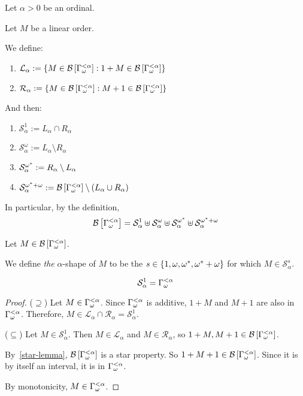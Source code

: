 \begin{definitions}
  Let $\alpha > 0$ be an ordinal.

  Let $M$ be a linear order.

  We define:
  \begin{enumerate}
    \item $\mathcal{L}_{\alpha} := \left\{ {M \in \mathcal{B} \left[ {{\Gamma_{\omega}^{< \alpha}}} \right] : 1 + M \in \mathcal{B} \left[ {{\Gamma_{\omega}^{< \alpha}}} \right]} \right\}$
    \item $\mathcal{R}_{\alpha} := \left\{ {M \in \mathcal{B} \left[ {{\Gamma_{\omega}^{< \alpha}}} \right] : M + 1 \in \mathcal{B} \left[ {{\Gamma_{\omega}^{< \alpha}}} \right]} \right\}$
  \end{enumerate}

  And then:
  \begin{enumerate}
    \item $\mathcal{S}^{1}_{\alpha} := L_{\alpha} \cap R_{\alpha}$
    \item $\mathcal{S}^{\omega}_{\alpha} := L_{\alpha} \setminus R_{\alpha}$
    \item $\mathcal{S}^{\omega^\ast}_{\alpha} := R_{\alpha} \setminus L_{\alpha}$
    \item $\mathcal{S}^{\omega^\ast + \omega}_{\alpha} := \mathcal{B} \left[ {{\Gamma_{\omega}^{< \alpha}}} \right] \setminus (L_{\alpha} \cup R_{\alpha})$
  \end{enumerate}

  In particular, by the definition,
  \[
    \mathcal{B} \left[ {{\Gamma_{\omega}^{< \alpha}}} \right]
    = \mathcal{S}^{1}_{\alpha}
    \uplus \mathcal{S}^{\omega}_{\alpha}
    \uplus \mathcal{S}^{\omega^\ast}_{\alpha}
    \uplus \mathcal{S}^{\omega^\ast + \omega}_{\alpha}
  \]

  Let $M \in \mathcal{B} \left[ {{\Gamma_{\omega}^{< \alpha}}} \right]$.

  We define \emph{the} $\alpha$-shape
  of $M$ to be the $s \in \left\{ {1, \omega, \omega^\ast, \omega^\ast + \omega} \right\}$
  for which $M \in \mathcal{S}^{s}_{\alpha}$.
\end{definitions}

\begin{lemma}\label{b_alpha-structure-lemma-1}
  \[
    \mathcal{S}^{1}_{\alpha} = \Gamma_{\omega}^{< \alpha}
  \]
\end{lemma}

\begin{proof}
  ($\supseteq$) Let $M \in \Gamma_{\omega}^{< \alpha}$.
  Since $\Gamma_{\omega}^{< \alpha}$ is additive, $1 + M$ and $M + 1$ are also in $\Gamma_{\omega}^{< \alpha}$.
  Therefore, $M \in \mathcal{L}_{\alpha} \cap \mathcal{R}_{\alpha}
    = \mathcal{S}^{1}_{\alpha}$.

  ($\subseteq$) Let $M \in \mathcal{S}^{1}_{\alpha}$.
  Then $M \in \mathcal{L}_{\alpha}$ and $M \in \mathcal{R}_{\alpha}$,
  so $1 + M, M + 1 \in \mathcal{B} \left[ {{\Gamma_{\omega}^{< \alpha}}} \right]$.

  By~\cref{star-lemma}, $\mathcal{B} \left[ {{\Gamma_{\omega}^{< \alpha}}} \right]$ is a star property.
  So $1 + M + 1 \in \mathcal{B} \left[ {{\Gamma_{\omega}^{< \alpha}}} \right]$. Since it is by itself
  an interval, it is in $\Gamma_{\omega}^{< \alpha}$.

  By monotonicity, $M \in \Gamma_{\omega}^{< \alpha}$.
\end{proof}

